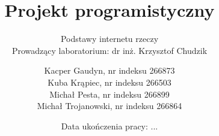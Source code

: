 \documentclass[10pt, a4paper, titlepage]{article}
\title{Projekt programistyczny}
\subtitle{
  Podstawy internetu rzeczy \\
  Prowadzący laboratorium: dr inż. Krzysztof Chudzik
}
\author{
  Kacper Gaudyn, nr indeksu 266873 \\
  Kuba Krąpiec, nr indeksu 266503 \\
  Michał Pesta, nr indeksu 266899 \\
  Michał Trojanowski, nr indeksu 266864
}
\date{Data ukończenia pracy: ...}
\begin{document}
  \begin{titlingpage}
    \maketitle
  \end{titlingpage}
  \tableofcontents

  \newpage
  
  
  
  
  
  
  
\end{document}
